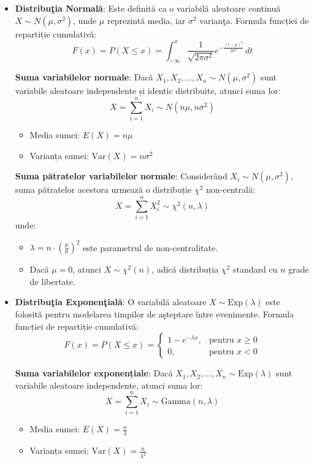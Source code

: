 \documentclass[a4paper,11pt]{article}
\begin{document}
\begin{itemize}
  \item \textbf{Distribu\c{t}ia Normal\u{a}}: Este definit\u{a} ca o variabil\u{a} aleatoare continu\u{a} $X \sim N(\mu, \sigma^2)$, unde $\mu$ reprezint\u{a} media, iar $\sigma^2$ varian\c{t}a.
  \newline
  Formula funcției de repartiție cumulativă:
  \[
  F(x) = P(X \leq x) = \int_{-\infty}^{x} \frac{1}{\sqrt{2\pi \sigma^2}} e^{-\frac{(t - \mu)^2}{2\sigma^2}} \, dt
  \]

  \textbf{Suma variabilelor normale}:  
  Dacă $X_1, X_2, ..., X_n \sim N(\mu, \sigma^2)$ sunt variabile aleatoare independente și identic distribuite, atunci suma lor:
  \[
  X = \sum_{i=1}^{n} X_i \sim N(n\mu, n\sigma^2)
  \]
  \begin{itemize}
    \item Media sumei: $E(X) = n\mu$
    \item Varianța sumei: $\text{Var}(X) = n\sigma^2$
  \end{itemize}

  \textbf{Suma pătratelor variabilelor normale}:  
  Considerând $X_i \sim N(\mu, \sigma^2)$, suma pătratelor acestora urmează o distribuție $\chi^2$ non-centrală:
  \[
  X = \sum_{i=1}^{n} X_i^2 \sim \chi^2(n, \lambda)
  \]
  unde:
  \begin{itemize}
    \item $\lambda = n \cdot \left( \frac{\mu}{\sigma} \right)^2$ este parametrul de non-centralitate.
    \item Dacă $\mu = 0$, atunci $X \sim \chi^2(n)$, adică distribuția $\chi^2$ standard cu $n$ grade de libertate.
  \end{itemize}

  \item \textbf{Distribu\c{t}ia Exponen\c{t}ial\u{a}}: O variabil\u{a} aleatoare $X \sim \text{Exp}(\lambda)$ este folosit\u{a} pentru modelarea timpilor de a\c{s}teptare între evenimente.
  \newline
  Formula funcției de repartiție cumulativă:
  \[
  F(x) = P(X \leq x) = 
  \begin{cases}
  1 - e^{-\lambda x}, & \text{pentru } x \geq 0 \\
  0, & \text{pentru } x < 0
  \end{cases}
  \]

  \textbf{Suma variabilelor exponențiale}:  
  Dacă $X_1, X_2, ..., X_n \sim \text{Exp}(\lambda)$ sunt variabile aleatoare independente, atunci suma lor:
  \[
  X = \sum_{i=1}^{n} X_i \sim \text{Gamma}(n, \lambda)
  \]
  \begin{itemize}
    \item Media sumei: $E(X) = \frac{n}{\lambda}$
    \item Varianța sumei: $\text{Var}(X) = \frac{n}{\lambda^2}$
  \end{itemize}


\end{itemize}
\end{document}

